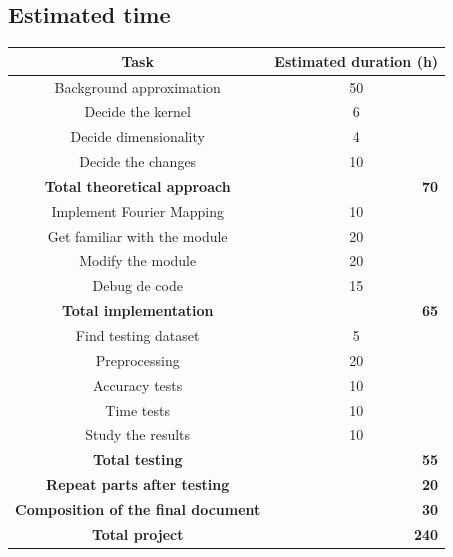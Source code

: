 \documentclass[a4paper]{article}
\begin{document}
        \subsection{Estimated time}

        \begin{center}
        \begin{tabular}{|c|c|}

            \hline
            \textbf{Task} & \textbf{Estimated duration (h)} \\
            \hline \hline
            Background approximation & 50 \\
            Decide the kernel & 6 \\
            Decide dimensionality & 4 \\
            Decide the changes & 10 \\
            \hline
            \textbf{Total theoretical approach} & \multicolumn{1}{|r|}{\textbf{70}} \\
            \hline
            Implement Fourier Mapping & 10 \\
            Get familiar with the module & 20 \\
            Modify the module & 20 \\
            Debug de code & 15 \\
            \hline
            \textbf{Total implementation} & \multicolumn{1}{|r|}{\textbf{65}} \\
            \hline
            Find testing dataset & 5 \\
            Preprocessing & 20 \\
            Accuracy tests & 10 \\
            Time tests & 10 \\
            Study the results & 10 \\
            \hline
            \textbf{Total testing} & \multicolumn{1}{|r|}{\textbf{55}} \\
            \hline
            \textbf{Repeat parts after testing} & \multicolumn{1}{|r|}{\textbf{20}} \\
            \hline
            \textbf{Composition of the final document} & \multicolumn{1}{|r|}{\textbf{30}} \\
            \hline
            \hline
            \textbf{Total project} & \multicolumn{1}{|r|}{\textbf{240}} \\
            \hline

        \end{tabular}
        \end{center}
\end{document}
